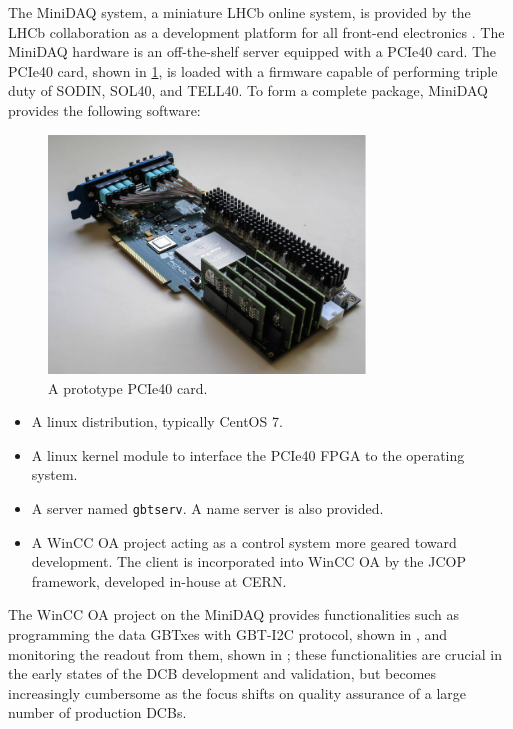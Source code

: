 The MiniDAQ system,
a miniature LHCb online system,
is provided by the LHCb collaboration as a development
platform for all front-end electronics \cite{GranadoCardoso:2702137}.
The MiniDAQ hardware is an off-the-shelf server equipped with a PCIe40 card.
The PCIe40 card, shown in \cref{fig:pcie40}, is loaded with a firmware capable
of performing triple duty of SODIN, SOL40, and TELL40.
To form a complete package, MiniDAQ provides the following software:

\begin{figure}[!htb]
    \centering
    \includegraphics[width=0.75\textwidth]{./figs-ut-upgrade/online/pcie40.pdf}
    \caption{
        A prototype PCIe40 card.
    }
    \label{fig:pcie40}
\end{figure}

\begin{itemize}
    \item A linux distribution, typically CentOS 7.
    \item A linux kernel module to interface the PCIe40 FPGA to the operating
        system.
    \item A \dim server named \lstinline{gbtserv}. A \dim name server is also
        provided.
    \item A WinCC OA project acting as a control system more geared toward
        development.
        The \dim client is incorporated into WinCC OA by the JCOP framework,
        developed in-house at CERN.
\end{itemize}

The WinCC OA project on the MiniDAQ provides functionalities such as programming
the data GBTxes with GBT-I2C protocol,
shown in \label{fig:wincc-oa-gbt},
and monitoring the readout from them,
shown in \label{fig:wincc-oa-memmon};
these functionalities are crucial in the early states of the DCB development and
validation,
but becomes increasingly cumbersome as the focus shifts on quality assurance
of a large number of production DCBs.

